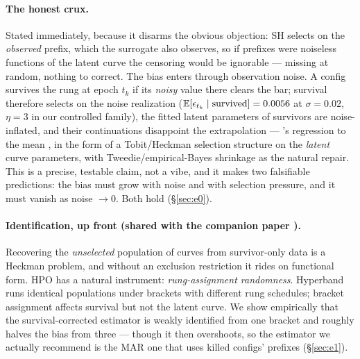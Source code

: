 \documentclass[10pt]{article}
\newcommand{\E}{\mathbb{E}}
\begin{document}
\paragraph{The honest crux.} Stated immediately, because it disarms the
obvious objection: SH selects on the \emph{observed} prefix, which the
surrogate also observes, so if prefixes were noiseless functions of the
latent curve the censoring would be ignorable --- missing at random,
nothing to correct. The bias enters through observation noise. A config
survives the rung at epoch $t_k$ if its \emph{noisy} value there clears
the bar; survival therefore selects on the noise realization
($\E[\epsilon_{t_k} \mid \text{survived}] = \GateEpsSurv$ at $\sigma =
0.02$, $\eta = 3$ in our controlled family), the fitted latent parameters
of survivors are noise-inflated, and their continuations disappoint the
extrapolation --- \citeauthor{galton1886}'s regression to the mean
\citep{galton1886}, in the form of a Tobit/Heckman selection structure
\citep{tobin1958,heckman1979} on the \emph{latent} curve parameters, with
Tweedie/empirical-Bayes shrinkage \citep{efron2011tweedie} as the natural
repair. This is a precise, testable claim, not a vibe, and it makes two
falsifiable predictions: the bias must grow with noise and with selection
pressure, and it must vanish as noise $\to 0$. Both hold
(\S\ref{sec:e0}).

\paragraph{Identification, up front (shared with the companion paper
\citealp{howe2026heckuq}).} Recovering the \emph{unselected} population
of curves from survivor-only data is a Heckman problem, and without an
exclusion restriction it rides on functional form. HPO has a natural
instrument: \emph{rung-assignment randomness}. Hyperband runs identical
populations under brackets with different rung schedules; bracket
assignment affects survival but not the latent curve. We show empirically
that the survival-corrected estimator is weakly identified from one
bracket and roughly halves the bias from three --- though it then
overshoots, so the estimator we actually recommend is the MAR one that
uses killed configs' prefixes (\S\ref{sec:e1}).
\end{document}
